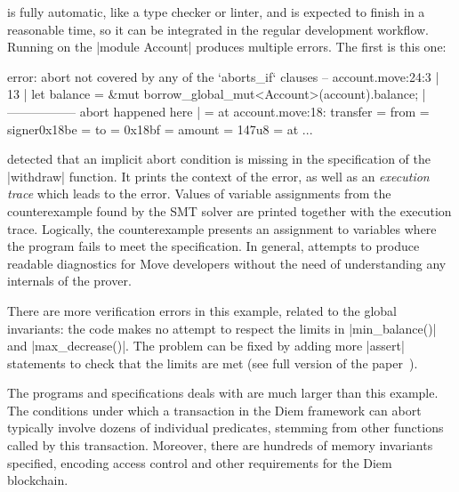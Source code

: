 
\label{sec:RunningProver}

\MVP is fully automatic, like a type checker or linter, and is
expected to finish in a reasonable time, so it can be integrated in
the regular development workflow. Running \MVP on the |module Account| produces
multiple errors. The first is this one:

\begin{MoveDiag}
error: abort not covered by any of the `aborts_if` clauses
   -- account.move:24:3
   |
13 |       let balance = &mut borrow_global_mut<Account>(account).balance;
   |                          ----------------- abort happened here
   |
   =     at account.move:18: transfer
   =         from = signer{0x18be}
   =         to = 0x18bf
   =         amount = 147u8
   =     at ...
\end{MoveDiag}

\noindent \MVP detected that an implicit abort condition is missing in the
specification of the |withdraw| function. It prints the context of the error, as
well as an \emph{execution trace} which leads to the error. Values of variable
assignments from the counterexample found by the SMT solver are printed together
with the execution trace. Logically, the counterexample presents an
assignment to variables where the program fails to meet the specification. In
general, \MVP attempts to produce readable diagnostics for Move developers
without the need of understanding any internals of the prover.

There are more verification errors in this example, related to the global
invariants: the code makes no attempt to respect the limits in |min_balance()|
and |max_decrease()|.  The problem can be fixed by adding more |assert|
statements to check that the limits are met (see full version of the paper~\cite{FULL_VERSION}).


The programs and specifications \MVP deals with are much larger than
this example. The conditions under which a transaction
in the Diem framework can abort typically involve dozens of individual predicates,
stemming from other functions called by this transaction. Moreover, there are
hundreds of memory invariants specified, encoding access control and other
requirements for the Diem blockchain.

